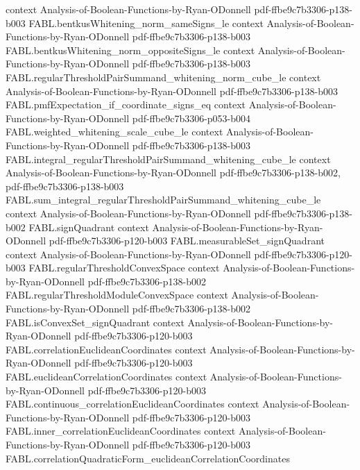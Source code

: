\begin{theorem}
  {context}
  {Analysis-of-Boolean-Functions-by-Ryan-ODonnell}
  {pdf-ffbe9c7b3306-p138-b003}
\proofstep
  {FABL.bentkusWhitening_norm_sameSigns_le}
  {context}
  {Analysis-of-Boolean-Functions-by-Ryan-ODonnell}
  {pdf-ffbe9c7b3306-p138-b003}
\proofstep
  {FABL.bentkusWhitening_norm_oppositeSigns_le}
  {context}
  {Analysis-of-Boolean-Functions-by-Ryan-ODonnell}
  {pdf-ffbe9c7b3306-p138-b003}
\proofstep
  {FABL.regularThresholdPairSummand_whitening_norm_cube_le}
  {context}
  {Analysis-of-Boolean-Functions-by-Ryan-ODonnell}
  {pdf-ffbe9c7b3306-p138-b003}
\proofstep
  {FABL.pmfExpectation_if_coordinate_signs_eq}
  {context}
  {Analysis-of-Boolean-Functions-by-Ryan-ODonnell}
  {pdf-ffbe9c7b3306-p053-b004}
\proofstep
  {FABL.weighted_whitening_scale_cube_le}
  {context}
  {Analysis-of-Boolean-Functions-by-Ryan-ODonnell}
  {pdf-ffbe9c7b3306-p138-b003}
\proofstep
  {FABL.integral_regularThresholdPairSummand_whitening_cube_le}
  {context}
  {Analysis-of-Boolean-Functions-by-Ryan-ODonnell}
  {pdf-ffbe9c7b3306-p138-b002,
    pdf-ffbe9c7b3306-p138-b003}
\proofstep
  {FABL.sum_integral_regularThresholdPairSummand_whitening_cube_le}
  {context}
  {Analysis-of-Boolean-Functions-by-Ryan-ODonnell}
  {pdf-ffbe9c7b3306-p138-b002}
\proofstep
  {FABL.signQuadrant}
  {context}
  {Analysis-of-Boolean-Functions-by-Ryan-ODonnell}
  {pdf-ffbe9c7b3306-p120-b003}
\proofstep
  {FABL.measurableSet_signQuadrant}
  {context}
  {Analysis-of-Boolean-Functions-by-Ryan-ODonnell}
  {pdf-ffbe9c7b3306-p120-b003}
\proofstep
  {FABL.regularThresholdConvexSpace}
  {context}
  {Analysis-of-Boolean-Functions-by-Ryan-ODonnell}
  {pdf-ffbe9c7b3306-p138-b002}
\proofstep
  {FABL.regularThresholdModuleConvexSpace}
  {context}
  {Analysis-of-Boolean-Functions-by-Ryan-ODonnell}
  {pdf-ffbe9c7b3306-p138-b002}
\proofstep
  {FABL.isConvexSet_signQuadrant}
  {context}
  {Analysis-of-Boolean-Functions-by-Ryan-ODonnell}
  {pdf-ffbe9c7b3306-p120-b003}
\proofstep
  {FABL.correlationEuclideanCoordinates}
  {context}
  {Analysis-of-Boolean-Functions-by-Ryan-ODonnell}
  {pdf-ffbe9c7b3306-p120-b003}
\proofstep
  {FABL.euclideanCorrelationCoordinates}
  {context}
  {Analysis-of-Boolean-Functions-by-Ryan-ODonnell}
  {pdf-ffbe9c7b3306-p120-b003}
\proofstep
  {FABL.continuous_correlationEuclideanCoordinates}
  {context}
  {Analysis-of-Boolean-Functions-by-Ryan-ODonnell}
  {pdf-ffbe9c7b3306-p120-b003}
\proofstep
  {FABL.inner_correlationEuclideanCoordinates}
  {context}
  {Analysis-of-Boolean-Functions-by-Ryan-ODonnell}
  {pdf-ffbe9c7b3306-p120-b003}
\proofstep
  {FABL.correlationQuadraticForm_euclideanCorrelationCoordinates}

\end{theorem}
